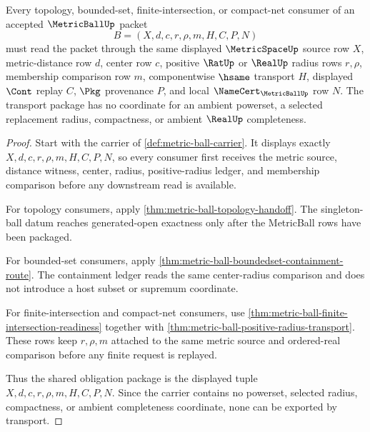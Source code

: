 \begin{theorem}
\label{thm:metric-ball-obligation-transport-package}
Every topology, bounded-set, finite-intersection, or compact-net consumer of an accepted $\MetricBallUp$ packet
$$
B=(X,d,c,r,\rho,m,H,C,P,N)
$$
must read the packet through the same displayed $\MetricSpaceUp$ source row $X$, metric-distance row $d$, center row $c$, positive $\RatUp$ or $\RealUp$ radius rows $r,\rho$, membership comparison row $m$, componentwise $\hsame$ transport $H$, displayed $\Cont$ replay $C$, $\Pkg$ provenance $P$, and local $\NameCert_{\MetricBallUp}$ row $N$. The transport package has no coordinate for an ambient powerset, a selected replacement radius, compactness, or ambient $\RealUp$ completeness.
\end{theorem}
\begin{proof}
Start with the carrier of \autoref{def:metric-ball-carrier}. It displays exactly $X,d,c,r,\rho,m,H,C,P,N$, so every consumer first receives the metric source, distance witness, center, radius, positive-radius ledger, and membership comparison before any downstream read is available.

For topology consumers, apply \autoref{thm:metric-ball-topology-handoff}. The singleton-ball datum reaches generated-open exactness only after the MetricBall rows have been packaged.

For bounded-set consumers, apply \autoref{thm:metric-ball-boundedset-containment-route}. The containment ledger reads the same center-radius comparison and does not introduce a host subset or supremum coordinate.

For finite-intersection and compact-net consumers, use \autoref{thm:metric-ball-finite-intersection-readiness} together with \autoref{thm:metric-ball-positive-radius-transport}. These rows keep $r,\rho,m$ attached to the same metric source and ordered-real comparison before any finite request is replayed.

Thus the shared obligation package is the displayed tuple $X,d,c,r,\rho,m,H,C,P,N$. Since the carrier contains no powerset, selected radius, compactness, or ambient completeness coordinate, none can be exported by transport.
\end{proof}

